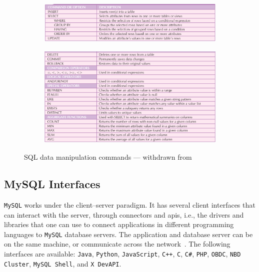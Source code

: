 \begin{figure}[htb!]
  \centering
  \begin{subfigure}[t]{.9\textwidth}
  \includegraphics[width=\textwidth]{img/sql-dml-1.png}%
\end{subfigure}
%
%
  \begin{subfigure}{.9\textwidth}
  \includegraphics[width=\textwidth]{img/sql-dml-2.png}%
\end{subfigure}
  \caption{SQL data manipulation commands --- withdrawn from~\cite{coronel2016database}}%
  \label{fig:sql-dml}
\end{figure}
%


\subsection{MySQL Interfaces}
\label{sec:sql-interfaces}
\texttt{MySQL} works under the client--server paradigm. It has several client
interfaces that can interact with the server, through connectors and
\glspl{api}, i.e., the drivers and libraries that one can use to connect
applications in different programming languages to \texttt{MySQL} database
servers.
The application and database server can be on the same machine, or communicate
across the network~\cite{MysqlConnAPIs}.
The following interfaces are available: \texttt{Java}, \texttt{Python},
\texttt{JavaScript}, \texttt{C++}, \texttt{C},
\texttt{C\#},
\texttt{PHP},
\texttt{OBDC}, \texttt{NBD Cluster},
\texttt{MySQL Shell}, and \texttt{X DevAPI}.

